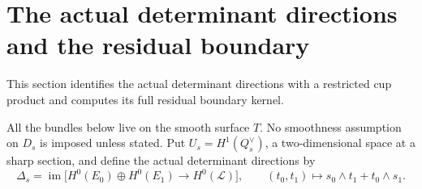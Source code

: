 \documentclass[11pt]{article}
\theoremstyle{definition}\newtheorem{definition}[theorem]{Definition}
\theoremstyle{remark}\newtheorem{remark}[theorem]{Remark}
\begin{document}
\section{The actual determinant directions and the residual boundary}
\label{sec:boundary}

This section identifies the actual determinant directions with a restricted cup product and computes its full residual boundary kernel.

All the bundles below live on the smooth surface $T$. No smoothness assumption on $D_s$ is imposed unless stated. Put $U_s=H^1(Q_s^\vee)$, a two-dimensional space at a sharp section, and define the actual determinant directions by
\[
 \Delta_s=\operatorname{im}\bigl[H^0(E_0)\oplus H^0(E_1)
 \longrightarrow H^0(\mathcal L)\bigr],\qquad
 (t_0,t_1)\longmapsto s_0\wedge t_1+t_0\wedge s_1.
\]
\end{document}
